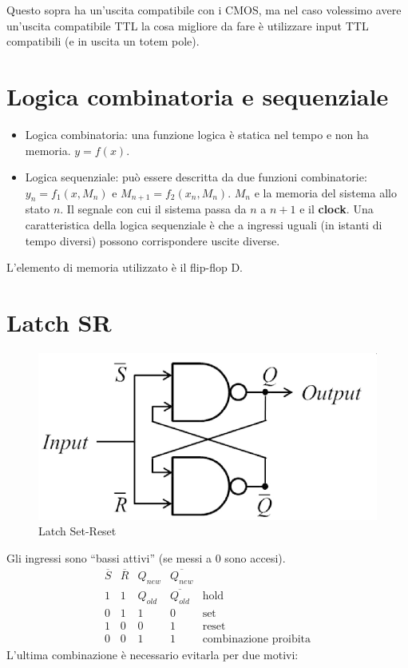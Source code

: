 \documentclass[
]{book}
\providecommand{\tightlist}{%
  \setlength{\itemsep}{0pt}\setlength{\parskip}{0pt}}
\begin{document}
Questo sopra ha un'uscita compatibile con i CMOS, ma nel caso volessimo
avere un'uscita compatibile TTL la cosa migliore da fare è utilizzare
input TTL compatibili (e in uscita un totem pole).

\section{Logica combinatoria e
sequenziale}\label{logica-combinatoria-e-sequenziale}

\begin{itemize}
\tightlist
\item
  Logica combinatoria: una funzione logica è statica nel tempo e non ha
  memoria. \(y=f(x)\).
\item
  Logica sequenziale: può essere descritta da due funzioni combinatorie:
  \(y_{n}=f_{1}(x,M_{n})\) e \(M_{n+1}=f_{2}(x_{n},M_{n})\). \(M_{n}\) e
  la memoria del sistema allo stato \(n\). \newline Il segnale con cui
  il sistema passa da \(n\) a \(n+1\) e il \textbf{clock}. Una
  caratteristica della logica sequenziale è che a ingressi uguali (in
  istanti di tempo diversi) possono corrispondere uscite diverse.
\end{itemize}

L'elemento di memoria utilizzato è il flip-flop D.

\section{Latch SR}\label{latch-sr}

\begin{figure}
\centering
\includegraphics[width=0.5\linewidth,height=\textheight,keepaspectratio]{immagini/28.png}
\caption{Latch Set-Reset}
\end{figure}

Gli ingressi sono ``bassi attivi'' (se messi a 0 sono accesi). \[
\begin{array}{ccccc}\overline{S}&\overline{R}&Q_{new}&\overline{Q_{new}}\\\hline1&1&Q_{old}&\overline{Q_{old}}&\text{hold}\\0&1&1&0&\text{set}\\1&0&0&1&\text{reset}\\0&0&1&1&\text{combinazione proibita}\end{array}
\] L'ultima combinazione è necessario evitarla per due motivi:
\end{document}
